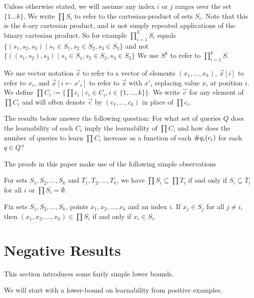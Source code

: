 \documentclass[11pt]{amsart}
\begin{document}
Unless otherwise stated, we will assume any index $i$ or $j$ ranges over the set $\{ 1 \dots k \}$.
We write $\prod S_i$ to refer to the cartesian-product of sets $S_i$. 
Note that this is the $k$-ary cartesian product, and is not simply repeated applications of the binary cartesian product.
So for example $\prod_{i=1}^3 S_i$ equals $\{ (s_1, s_2, s_3) \mid s_1 \in S_1, s_2 \in S_2, s_3 \in S_3 \}$ and not $\{ ((s_1, s_2), s_3) \mid s_1 \in S_1, s_2 \in S_2, s_3 \in S_3 \}$
We use $S^k$ to refer to $\prod_{i=1}^k S$. 

We use vector notation $\vec{x}$ to refer to a vector of elements $(x_1,\dots, x_k)$, $\vec{x}[i]$ to refer to $x_i$, and $\vec{x}[i \leftarrow x'_i]$ to refer to $\vec{x}$ with $x'_i$ replacing value $x_i$ at position $i$. 
We define $\prod C_i := \{ \prod c_i \mid c_i \in C_i, i \in \{1,\dots,k\} \}$. 
We write $\vec{c}$ for any element of $\prod C_i $ and will often denote $\vec{c}$ by $(c_1, \dots, c_k)$ in place of $\prod c_i$. 

The results below answer the following question:
For what set of queries $Q$ does the learnability of each $C_i$ imply the learnability of $\prod C_i $ and how does the number of queries to learn $\prod C_i $ increase as a function of each $\#q_{i}(c_i)$ for each $q \in Q$?

The proofs in this paper make use of the following simple observations 
\begin{observation}
\label{subobs}
For sets $S_1, S_2, \dots, S_k$ and $T_1, T_2, \dots, T_k$, we have $\prod S_i \subseteq \prod T_i$ if and only if $S_i \subseteq T_i$ for all $i$ or $\prod S_i = \emptyset$.
\end{observation}

\begin{observation}
\label{posobs}
Fix sets $S_1, S_2, \dots, S_k$, points $x_1, x_2, \dots, x_k$ and an index $i$. 
If $x_j \in S_j$ for all $j \ne i$, then $(x_1, x_2, \dots, x_k) \in \prod S_i$ if and only if $x_i \in S_i$.
\end{observation}


\section{Negative Results}
This section introduces some fairly simple lower bounds.

We will start with a lower-bound on learnability from positive examples. 
\end{document}
